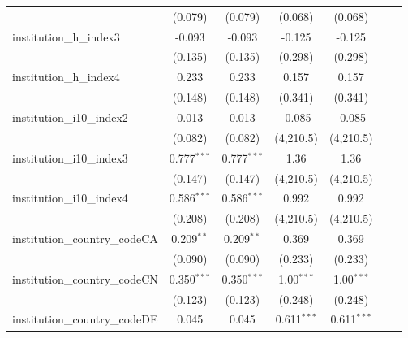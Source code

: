 \begin{tabular}{lcccccc}
                                         & (0.079)        & (0.079)        & (0.068)       & (0.068)       &     &   \\   
   institution\_h\_index3                & -0.093         & -0.093         & -0.125        & -0.125        &     &   \\   
                                         & (0.135)        & (0.135)        & (0.298)       & (0.298)       &     &   \\   
   institution\_h\_index4                & 0.233          & 0.233          & 0.157         & 0.157         &     &   \\   
                                         & (0.148)        & (0.148)        & (0.341)       & (0.341)       &     &   \\   
   institution\_i10\_index2              & 0.013          & 0.013          & -0.085        & -0.085        &     &   \\   
                                         & (0.082)        & (0.082)        & (4,210.5)     & (4,210.5)     &     &   \\   
   institution\_i10\_index3              & 0.777$^{***}$  & 0.777$^{***}$  & 1.36          & 1.36          &     &   \\   
                                         & (0.147)        & (0.147)        & (4,210.5)     & (4,210.5)     &     &   \\   
   institution\_i10\_index4              & 0.586$^{***}$  & 0.586$^{***}$  & 0.992         & 0.992         &     &   \\   
                                         & (0.208)        & (0.208)        & (4,210.5)     & (4,210.5)     &     &   \\   
   institution\_country\_codeCA          & 0.209$^{**}$   & 0.209$^{**}$   & 0.369         & 0.369         &     &   \\   
                                         & (0.090)        & (0.090)        & (0.233)       & (0.233)       &     &   \\   
   institution\_country\_codeCN          & 0.350$^{***}$  & 0.350$^{***}$  & 1.00$^{***}$  & 1.00$^{***}$  &     &   \\   
                                         & (0.123)        & (0.123)        & (0.248)       & (0.248)       &     &   \\   
   institution\_country\_codeDE          & 0.045          & 0.045          & 0.611$^{***}$ & 0.611$^{***}$ &     &   \\   

\end{tabular}
